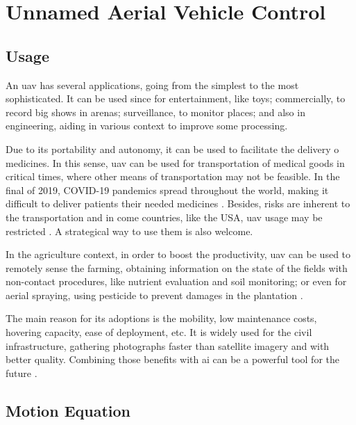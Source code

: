 \section{Unnamed Aerial Vehicle Control}

\subsection{Usage}

An \gls*{uav} has several applications, going from the simplest to the most sophisticated. It can be used since for entertainment, like toys; commercially, to record big shows in arenas; surveillance, to monitor places; and also in engineering, aiding in various context to improve some processing.

Due to its portability and autonomy, it can be used to facilitate the delivery o medicines. In this sense, \gls*{uav} can be used for transportation of medical goods in critical times, where other means of transportation may not be feasible.
In the final of 2019, COVID-19 pandemics spread throughout the world, making it difficult to deliver patients their needed medicines \cite{ramakrishnan2023,mcphillips2022}.
Besides, risks are inherent to the transportation and in come countries, like the USA, \gls*{uav} usage may be restricted \citep{thiels2015}. 
A strategical way to use them is also welcome.

In the agriculture context, in order to boost the productivity, \gls*{uav} can be used to remotely sense the farming, obtaining information on the state of the fields with non-contact procedures, like nutrient evaluation and soil monitoring; or even for aerial spraying, using pesticide to prevent damages in the plantation \citep{delcerro2021}.

The main reason for its adoptions is the mobility, low maintenance costs, hovering capacity, ease of deployment, etc. 
It is widely used for the civil infrastructure, gathering photographs faster than  satellite imagery and with better quality. 
Combining those benefits with \gls*{ai} can be a powerful tool for the future \citep{sivakumar2021}. 

\subsection{Motion Equation}

